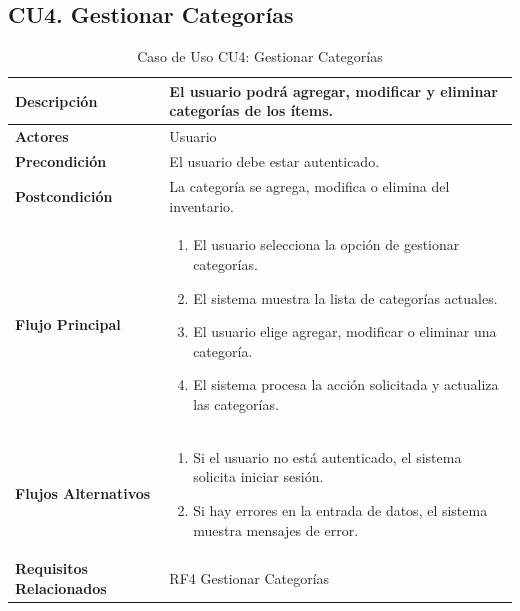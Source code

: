\documentclass{article}
\begin{document}
\subsection{CU4. Gestionar Categorías}
\begin{table}[H]
    \centering
    \begin{tabular}{|l|p{10cm}|}
        \hline
        \textbf{Descripción} & El usuario podrá agregar, modificar y eliminar categorías de los ítems. \\ \hline
        \textbf{Actores} & Usuario \\ \hline
        \textbf{Precondición} & El usuario debe estar autenticado. \\ \hline
        \textbf{Postcondición} & La categoría se agrega, modifica o elimina del inventario. \\ \hline
        \textbf{Flujo Principal} & 
        \begin{enumerate}
            \item El usuario selecciona la opción de gestionar categorías.
            \item El sistema muestra la lista de categorías actuales.
            \item El usuario elige agregar, modificar o eliminar una categoría.
            \item El sistema procesa la acción solicitada y actualiza las categorías.
        \end{enumerate} \\ \hline
        \textbf{Flujos Alternativos} & 
        \begin{enumerate}
            \item Si el usuario no está autenticado, el sistema solicita iniciar sesión.
            \item Si hay errores en la entrada de datos, el sistema muestra mensajes de error.
        \end{enumerate} \\ \hline
        \textbf{Requisitos Relacionados} & RF4 Gestionar Categorías \\ \hline
    \end{tabular}
    \caption{Caso de Uso CU4: Gestionar Categorías}
\end{table}
\end{document}
